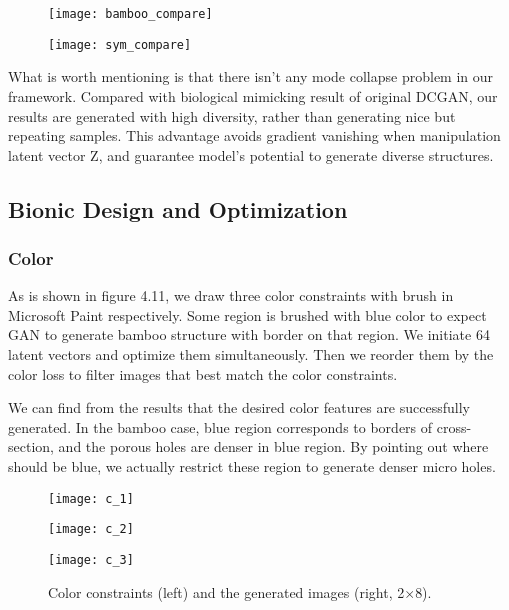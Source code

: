 \begin{figure}
	\centering
	\texttt{[image: bamboo\_compare]}
	\label{fig:17}
\end{figure}

\begin{figure}
	\centering
	\texttt{[image: sym\_compare]}
	\label{fig:18}
\end{figure}

What is worth mentioning is that there isn't any mode collapse problem in our framework. Compared with biological mimicking result of original DCGAN, our results are generated with high diversity, rather than generating nice but repeating samples. This advantage avoids gradient vanishing when manipulation latent vector Z, and guarantee model's potential to generate diverse structures.
\subsection{Bionic Design and Optimization}
\subsubsection{Color}

As is shown in figure 4.11, we draw three color constraints with brush in Microsoft Paint respectively. Some region is brushed with blue color to expect GAN to generate bamboo structure with border on that region. We initiate 64 latent vectors and optimize them simultaneously. Then we reorder them by the color loss to filter images that best match the color constraints.

We can find from the results that the desired color features are successfully generated. In the bamboo case, blue region corresponds to borders of cross-section, and the porous holes are denser in blue region. By pointing out where should be blue, we actually restrict these region to generate denser micro holes. 


\begin{figure}
	\centering

		\begin{minipage}[b]{0.8\textwidth}
			\texttt{[image: c\_1]}\\
		\end{minipage}


		\begin{minipage}[b]{0.8\textwidth}
			\texttt{[image: c\_2]}\\
		\end{minipage}


		\begin{minipage}[b]{0.8\textwidth}
			\texttt{[image: c\_3]}
		\end{minipage}

	\caption{Color constraints (left) and the generated images (right, 2$\times$8).} \label{fig:19}
\end{figure} 

